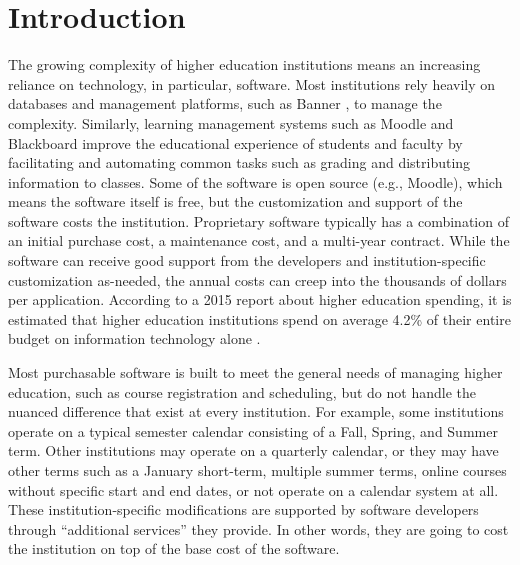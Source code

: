 \section{Introduction}

The growing complexity of higher education institutions means an increasing reliance on technology, in particular, software. Most institutions rely heavily on databases and management platforms, such as Banner \cite{BannerWebsite}, to manage the complexity. Similarly, learning management systems such as Moodle \cite{MoodleWebsite} and Blackboard \cite{BlackboardWebsite} improve the educational experience of students and faculty by facilitating and automating common tasks such as grading and distributing information to classes. Some of the software is open source (e.g., Moodle), which means the software itself is free, but the customization and support of the software costs the institution. Proprietary software typically has a combination of an initial purchase cost, a maintenance cost, and a multi-year contract. While the software can receive good support from the developers and institution-specific customization as-needed, the annual costs can creep into the thousands of dollars per application. According to a 2015 report about higher education spending, it is estimated that higher education institutions spend on average 4.2\% of their entire budget on information technology alone \cite{CDSBenchmarkReport}. 



Most purchasable software is built to meet the general needs of managing higher education, such as course registration and scheduling, but do not handle the nuanced difference that exist at every institution. For example, some institutions operate on a typical semester calendar consisting of a Fall, Spring, and Summer term. Other institutions may operate on a quarterly calendar, or they may have other terms such as a January short-term, multiple summer terms, online courses without specific start and end dates, or not operate on a calendar system at all. These institution-specific modifications are supported by software developers through ``additional services'' they provide. In other words, they are going to cost the institution on top of the base cost of the software.

